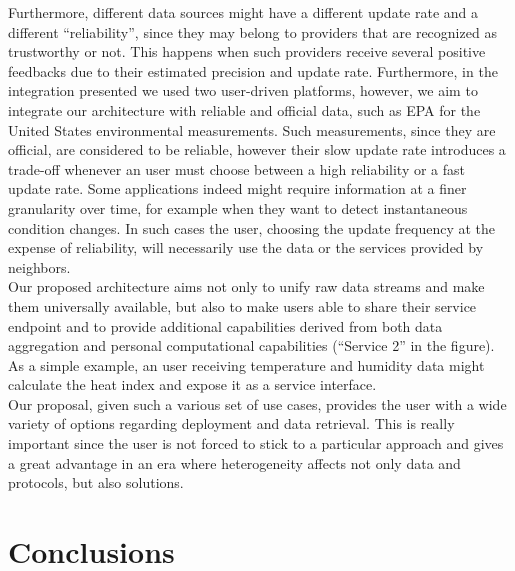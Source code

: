 \documentclass[conference]{IEEEtran}
\begin{document}
Furthermore, different data sources might have a different update rate and a different ``reliability'', since they may belong to providers that are recognized as trustworthy or not.
This happens when such providers receive several positive feedbacks due to their estimated precision and update rate.
Furthermore, in the integration presented we used two user-driven platforms, however, we aim to integrate our architecture with reliable and official data, such as EPA for the United States environmental measurements.
Such measurements, since they are official, are considered to be reliable, however their slow update rate introduces a trade-off whenever an user must choose between a high reliability or a fast update rate.
Some applications indeed might require information at a finer granularity over time, for example when they want to detect instantaneous condition changes.
In such cases the user, choosing the update frequency at the expense of reliability, will necessarily use the data or the services provided by neighbors.
\\

Our proposed architecture aims not only to unify raw data streams and make them universally available, but also to make users able to share their service endpoint and to provide additional capabilities derived from both data aggregation and personal computational capabilities (``Service 2'' in the figure).
As a simple example, an user receiving temperature and humidity data might calculate the heat index and expose it as a service interface.
\\

Our proposal, given such a various set of use cases, provides the user with a wide variety of options regarding deployment and data retrieval.
This is really important since the user is not forced to stick to a particular approach and gives a great advantage in an era where heterogeneity affects not only data and protocols, but also solutions.

\section{Conclusions}







\end{document}
